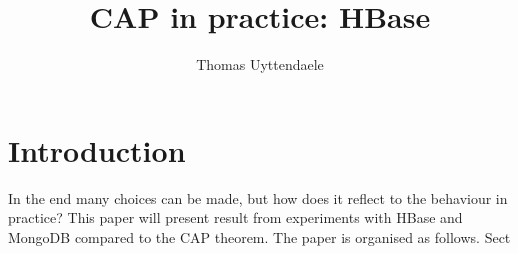 \documentclass[final,5p,times]{elsarticle}
\begin{document}
\begin{frontmatter}



\title{CAP in practice: HBase}


\author{Thomas Uyttendaele}

\address{}

\begin{abstract}

\end{abstract}

\begin{keyword}

\end{keyword}

\end{frontmatter}


\section{Introduction}

In the end many choices can be made, but how does it reflect to the behaviour in practice? This paper will present result from experiments with HBase and MongoDB compared to the CAP theorem. The paper is organised as follows. Sect
\end{document}
